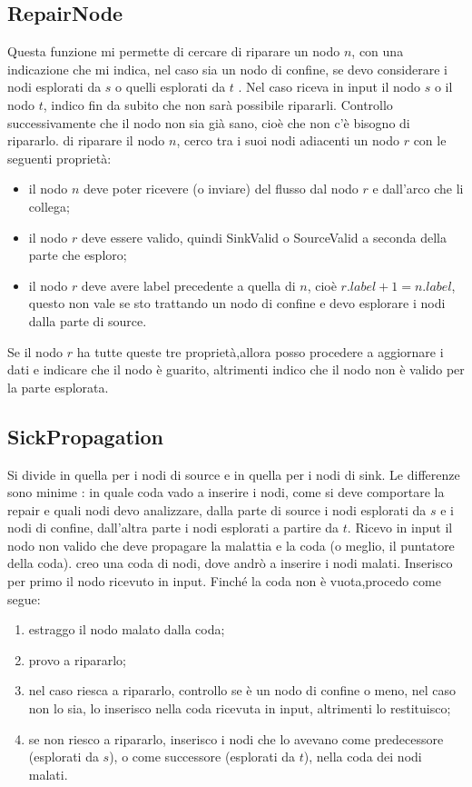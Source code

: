 \documentclass{article}
\begin{document}
\subsection{RepairNode}
Questa funzione mi permette di cercare di riparare un nodo $n$, con una indicazione che mi indica, nel caso sia un nodo di confine, se devo considerare i nodi esplorati da $s$ o quelli esplorati da $t$ .
Nel caso riceva in input il nodo $s$ o il nodo $t$, indico fin da subito che non sarà possibile ripararli.
Controllo successivamente che il nodo non sia già sano, cioè che non c'è bisogno di ripararlo.
 di riparare il nodo $n$, cerco tra i suoi nodi adiacenti un nodo $r$ con le seguenti proprietà:
\begin{itemize}
    \item il nodo $n$ deve poter ricevere (o inviare) del flusso dal nodo $r$ e dall'arco che li collega;
    \item il nodo $r$ deve essere valido, quindi SinkValid o SourceValid a seconda della parte che esploro;
    \item il nodo $r$ deve avere label precedente a quella di $n$, cioè $r.label +1 = n.label$, questo non vale se sto trattando un nodo di confine e devo esplorare i nodi dalla parte di source.
\end{itemize}
Se il nodo $r$ ha tutte queste tre proprietà,allora posso procedere a aggiornare i dati e indicare che il nodo è guarito, altrimenti indico che il nodo non è valido per la parte esplorata.

\subsection{SickPropagation}
Si divide in quella per i nodi di source e in quella per i nodi di sink.
Le differenze sono minime : in quale coda vado a inserire i nodi, come si deve comportare la repair e quali nodi devo analizzare, dalla parte di source i nodi esplorati da $s$ e i nodi di confine, dall'altra parte i nodi esplorati a partire da $t$.
Ricevo in input il nodo non valido che deve propagare la malattia e la coda (o meglio, il puntatore della coda).
creo una coda di nodi, dove andrò a inserire i nodi malati.
Inserisco per primo il nodo ricevuto in input.
Finché la coda non è vuota,procedo come segue:
\begin{enumerate}
    \item estraggo il nodo malato dalla coda;
    \item provo a ripararlo;
    \item nel caso riesca a ripararlo, controllo se è un nodo di confine o meno, nel caso non lo sia, lo inserisco nella coda ricevuta in input, altrimenti lo restituisco;
    \item se non riesco a ripararlo, inserisco i nodi che lo avevano come predecessore (esplorati da $s$), o come successore (esplorati da $t$), nella coda dei nodi malati.
\end{enumerate}  
\end{document}
